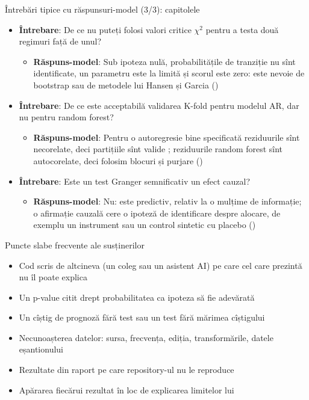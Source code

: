 \begin{frame}{Întrebări tipice cu răspunsuri-model (3/3): capitolele}
\itemsize{\footnotesize}
\begin{itemize}
    \item \textbf{Întrebare}: De ce nu puteți folosi valori critice $\chi^2$ pentru a testa două regimuri față de unul?
    \begin{itemize}
        \item \textbf{Răspuns-model}: Sub ipoteza nulă, probabilitățile de tranziție nu sînt identificate, un parametru este la limită și scorul este zero: este nevoie de bootstrap sau de metodele lui Hansen și Garcia ()
    \end{itemize}
    \item \textbf{Întrebare}: De ce este acceptabilă validarea K-fold pentru modelul AR, dar nu pentru random forest?
    \begin{itemize}
        \item \textbf{Răspuns-model}: Pentru o autoregresie bine specificată reziduurile sînt necorelate, deci partițiile sînt valide ; reziduurile random forest sînt autocorelate, deci folosim blocuri și purjare ()
    \end{itemize}
    \item \textbf{Întrebare}: Este un test Granger semnificativ un efect cauzal?
    \begin{itemize}
        \item \textbf{Răspuns-model}: Nu: este predictiv, relativ la o mulțime de informație; o afirmație cauzală cere o ipoteză de identificare despre alocare, de exemplu un instrument sau un control sintetic cu placebo ()
    \end{itemize}
\end{itemize}
\end{frame}

\begin{frame}{Puncte slabe frecvente ale susținerilor}
\itemsize{\small}
\begin{itemize}
    \item Cod scris de altcineva (un coleg sau un asistent AI) pe care cel care prezintă nu îl poate explica
    \item Un p-value citit drept probabilitatea ca ipoteza să fie adevărată
    \item Un cîștig de prognoză fără test sau un test fără mărimea cîștigului
    \item Necunoașterea datelor: sursa, frecvența, ediția, transformările, datele eșantionului
    \item Rezultate din raport pe care repository-ul nu le reproduce
    \item Apărarea fiecărui rezultat în loc de explicarea limitelor lui
\end{itemize}
\end{frame}


